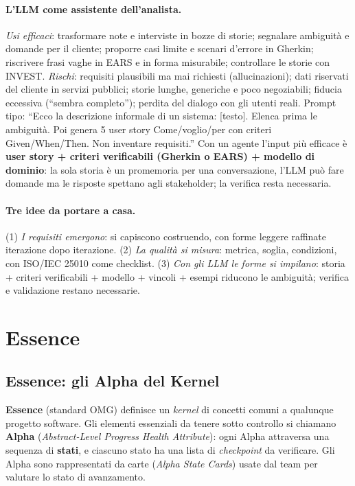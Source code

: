 \documentclass[a4paper,12pt]{article}
\begin{document}
\paragraph{L'LLM come assistente dell'analista.} \emph{Usi efficaci}: trasformare note e
interviste in bozze di storie; segnalare ambiguità e domande per il cliente; proporre casi
limite e scenari d'errore in Gherkin; riscrivere frasi vaghe in EARS e in forma misurabile;
controllare le storie con INVEST. \emph{Rischi}: requisiti plausibili ma mai richiesti
(allucinazioni); dati riservati del cliente in servizi pubblici; storie lunghe, generiche e
poco negoziabili; fiducia eccessiva (``sembra completo''); perdita del dialogo con gli utenti
reali. Prompt tipo: ``Ecco la descrizione informale di un sistema: [testo]. Elenca prima le
ambiguità. Poi genera 5 user story Come/voglio/per con criteri Given/When/Then. Non inventare
requisiti.'' Con un agente l'input più efficace è \textbf{user story + criteri verificabili
(Gherkin o EARS) + modello di dominio}: la sola storia è un promemoria per una conversazione,
l'LLM può fare domande ma le risposte spettano agli stakeholder; la verifica resta necessaria.

\paragraph{Tre idee da portare a casa.} (1) \emph{I requisiti emergono}: si capiscono
costruendo, con forme leggere raffinate iterazione dopo iterazione. (2) \emph{La qualità si
misura}: metrica, soglia, condizioni, con ISO/IEC 25010 come checklist. (3) \emph{Con gli LLM
le forme si impilano}: storia + criteri verificabili + modello + vincoli + esempi riducono le
ambiguità; verifica e validazione restano necessarie.

\newpage
\section{Essence}
\subsection{Essence: gli Alpha del Kernel}

\textbf{Essence} (standard OMG) definisce un \emph{kernel} di concetti comuni a
qualunque progetto software. Gli elementi essenziali da tenere sotto controllo si
chiamano \textbf{Alpha} (\emph{Abstract-Level Progress Health Attribute}): ogni Alpha
attraversa una sequenza di \textbf{stati}, e ciascuno stato ha una lista di
\emph{checkpoint} da verificare. Gli Alpha sono rappresentati da carte
(\emph{Alpha State Cards}) usate dal team per valutare lo stato di avanzamento.
\end{document}
